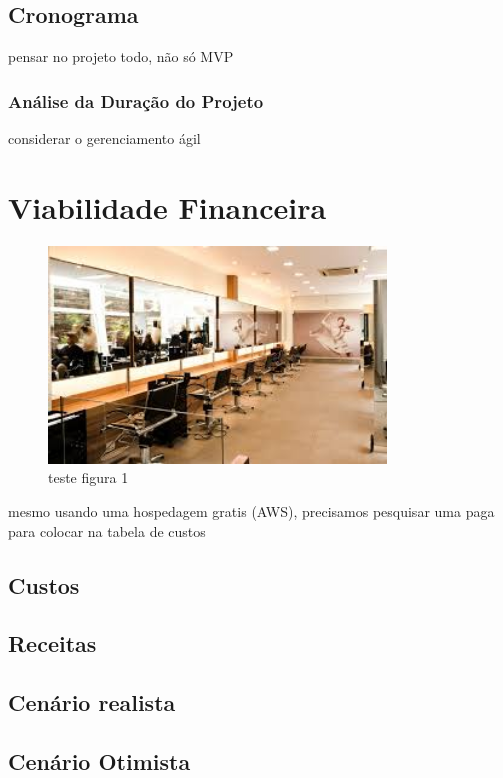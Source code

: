 \documentclass[
12pt,				%
openright,			%
twoside,			%
a4paper,			%
english,			%
french,				%
spanish,			%
brazil				%
]{abntex2}
\begin{document}
	\section{Cronograma}
	pensar no projeto todo, não só MVP
	\subsection{Análise da Duração do Projeto}
	considerar o gerenciamento ágil
	
	\chapter{Viabilidade Financeira}
	\begin{figure}[htb]
		\centering
		\includegraphics[width=0.8\textwidth]{images/salaoImagem.jpg}
		\caption{teste figura 1}
		\label{fig:imagem}
	\end{figure}
	
	mesmo usando uma hospedagem gratis (AWS), precisamos pesquisar uma paga para colocar na tabela de custos
	
	\section{Custos}
	
	
	
	\section{Receitas}
	\section{Cenário realista}
	\section{Cenário Otimista}
\end{document}
